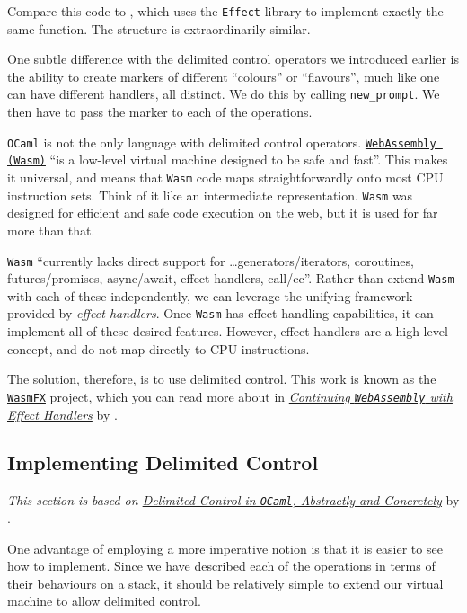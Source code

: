 Compare this code to , which uses the \texttt{Effect} library to implement exactly the same function. The structure is extraordinarily similar.

One subtle difference with the delimited control operators we introduced earlier is the ability to create markers of different ``colours'' or ``flavours'', much like one can have different handlers, all distinct. We do this by calling \texttt{new\_prompt}. We then have to pass the marker to each of the operations. 

\texttt{OCaml} is not the only language with delimited control operators. \href{https://webassembly.org/}{\texttt{WebAssembly (Wasm)}} ``is a low-level virtual
machine designed to be safe and fast''. This makes it universal, and means that \texttt{Wasm} code maps straightforwardly onto most CPU instruction sets. Think of it like an intermediate representation. \texttt{Wasm} was designed for efficient and safe code execution on the web, but it is used for far more than that. 

\texttt{Wasm} ``currently lacks direct support for \ldots generators/iterators, coroutines, futures/promises,
async/await, effect handlers, call/cc''. Rather than extend \texttt{Wasm} with each of these independently, we can leverage the unifying framework provided by \textit{effect handlers}. Once \texttt{Wasm} has effect handling capabilities, it can implement all of these desired features. However, effect handlers are a high level concept, and do not map directly to CPU instructions. 

The solution, therefore, is to use delimited control. This work is known as the \href{https://wasmfx.dev/}{\texttt{WasmFX}} project, which you can read more about in \textit{\href{https://arxiv.org/abs/2308.08347}{Continuing \texttt{WebAssembly} with Effect Handlers}} by \citet{phippscostin-2023}.

\subsection{Implementing Delimited Control}\label{section:delimited-control-implementation}
\textit{This section is based on \href{https://www.sciencedirect.com/science/article/pii/S0304397512001661}{Delimited Control in \texttt{OCaml}, Abstractly and Concretely}} by \citet{kisyelov-2014}.

One advantage of employing a more imperative notion is that it is easier to see how to implement. Since we have described each of the operations in terms of their behaviours on a stack, it should be relatively simple to extend our virtual machine to allow delimited control.

